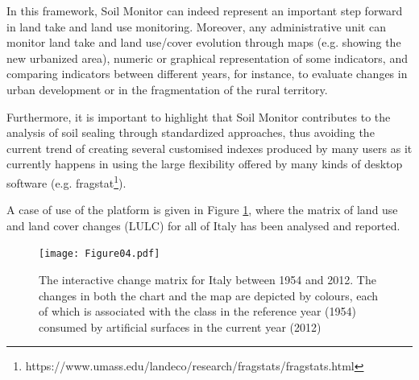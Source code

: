 \documentclass[APA,LATO1COL,doublespace]{WileyNJD-v2}
\begin{document}
In this framework, Soil Monitor can indeed represent an important step forward in land take and land use monitoring.
Moreover, any administrative unit can monitor land take and land use/cover evolution through maps (e.g. showing the new urbanized area), numeric or graphical representation of some indicators, and comparing indicators between different years, for instance, to evaluate changes in urban development or in the fragmentation of the rural territory.

Furthermore, it is important to highlight that Soil Monitor contributes to the analysis of soil sealing through standardized approaches, thus avoiding the current trend of creating several customised indexes produced by many users as it currently happens in using the large flexibility offered by many kinds of desktop software (e.g. fragstat\footnote{https://www.umass.edu/landeco/research/fragstats/fragstats.html}). 

A case of use of the platform is given in Figure \ref{fig:caseIT}, where the matrix of land use and land cover changes (LULC) for all of Italy has been analysed and reported. 

\begin{figure}[t]
    \centerline{\texttt{[image: Figure04.pdf]}}
    \caption{ The interactive change matrix for Italy between 1954 and 2012.
    The changes in both the chart and the map are depicted by colours, each of which is associated with the class in the reference year (1954) consumed by artificial surfaces in the current year (2012) } \label{fig:caseIT}
\end{figure}
\end{document}
